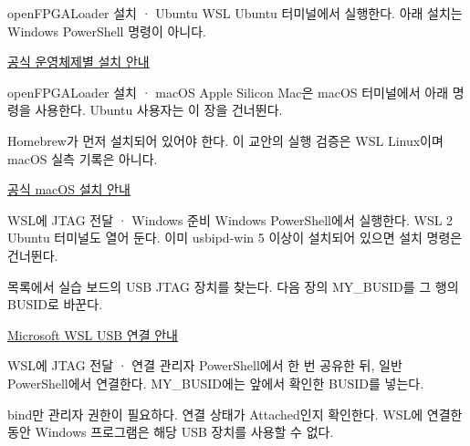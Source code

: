 \begin{frame}{openFPGALoader 설치 · Ubuntu}
\small
WSL Ubuntu 터미널에서 실행한다. 아래 설치는 Windows PowerShell 명령이 아니다.\par{}\href{https://trabucayre.github.io/openFPGALoader/guide/install.html}{공식 운영체제별 설치 안내}
\end{frame}

\begin{frame}{openFPGALoader 설치 · macOS}
\small
Apple Silicon Mac은 macOS 터미널에서 아래 명령을 사용한다. Ubuntu 사용자는 이 장을 건너뛴다.\par{}Homebrew가 먼저 설치되어 있어야 한다. 이 교안의 실행 검증은 WSL Linux이며 macOS 실측 기록은 아니다.\par\href{https://trabucayre.github.io/openFPGALoader/guide/install.html}{공식 macOS 설치 안내}
\end{frame}

\begin{frame}{WSL에 JTAG 전달 · Windows 준비}
\small
Windows PowerShell에서 실행한다. WSL 2 Ubuntu 터미널도 열어 둔다. 이미 usbipd-win 5 이상이 설치되어 있으면 설치 명령은 건너뛴다.\par{}목록에서 실습 보드의 USB JTAG 장치를 찾는다. 다음 장의 MY\_BUSID를 그 행의 BUSID로 바꾼다.\par\href{https://learn.microsoft.com/en-us/windows/wsl/connect-usb}{Microsoft WSL USB 연결 안내}
\end{frame}

\begin{frame}{WSL에 JTAG 전달 · 연결}
\small
관리자 PowerShell에서 한 번 공유한 뒤, 일반 PowerShell에서 연결한다. MY\_BUSID에는 앞에서 확인한 BUSID를 넣는다.\par{}bind만 관리자 권한이 필요하다. 연결 상태가 Attached인지 확인한다. WSL에 연결한 동안 Windows 프로그램은 해당 USB 장치를 사용할 수 없다.\par
\end{frame}

